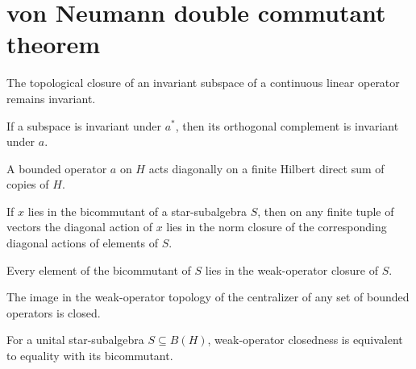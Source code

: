 \section{von Neumann double commutant theorem}

\begin{lemma}
\label{lem:vN-closure-invariant}
\leanok
The topological closure of an invariant subspace of a continuous linear operator remains invariant.
\end{lemma}

\begin{lemma}
\label{lem:vN-orthogonal-invariant}
\leanok
If a subspace is invariant under $a^*$, then its orthogonal complement is invariant under $a$.
\end{lemma}

\begin{definition}
\label{def:vN-diag}
\leanok
A bounded operator $a$ on $H$ acts diagonally on a finite Hilbert direct sum of copies of $H$.
\end{definition}

\begin{lemma}
\label{lem:vN-finite-approx}
\leanok
{}
If $x$ lies in the bicommutant of a star-subalgebra $S$, then on any finite tuple of vectors the diagonal action of $x$ lies in the norm closure of the corresponding diagonal actions of elements of $S$.
\end{lemma}

\begin{lemma}
\label{lem:vN-wot-approx}
\leanok
{}
Every element of the bicommutant of $S$ lies in the weak-operator closure of $S$.
\end{lemma}

\begin{lemma}
\label{lem:vN-centralizer-closed}
\leanok
The image in the weak-operator topology of the centralizer of any set of bounded operators is closed.
\end{lemma}

\begin{theorem}
\label{thm:von-neumann-double-commutant}
\leanok
{}
For a unital star-subalgebra $S\subseteq B(H)$, weak-operator closedness is equivalent to equality with its bicommutant.
\end{theorem}
